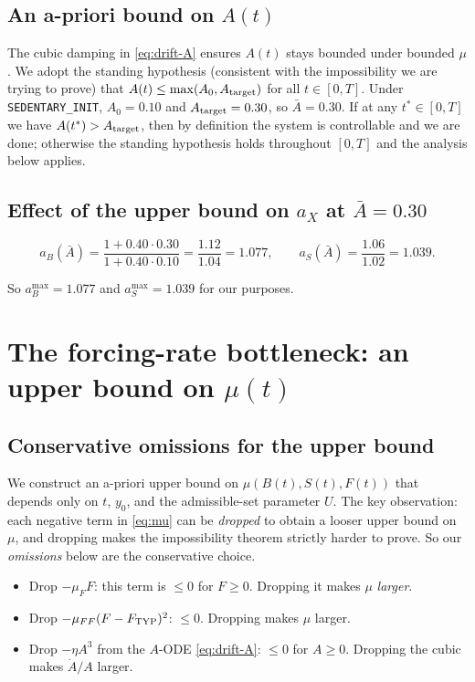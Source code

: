 \documentclass[11pt,a4paper]{article}
\theoremstyle{definition}
\begin{document}
\subsection{An a-priori bound on $A(t)$}

The cubic damping in \eqref{eq:drift-A} ensures $A(t)$ stays bounded under bounded $\mu$. We adopt the standing hypothesis (consistent with the impossibility we are trying to prove) that $A(t) \le \max(A_0, A_{\rm target})$ for all $t \in [0, T]$. Under \texttt{SEDENTARY\_INIT}, $A_0 = 0.10$ and $A_{\rm target} = 0.30$, so $\bar A = 0.30$. If at any $t^* \in [0, T]$ we have $A(t^*) > A_{\rm target}$, then by definition the system is controllable and we are done; otherwise the standing hypothesis holds throughout $[0, T]$ and the analysis below applies.

\subsection{Effect of the upper bound on $a_X$ at $\bar A = 0.30$}

\[
a_B(\bar A) = \frac{1 + 0.40 \cdot 0.30}{1 + 0.40 \cdot 0.10} = \frac{1.12}{1.04} = 1.077,
\qquad
a_S(\bar A) = \frac{1.06}{1.02} = 1.039.
\]

So $a_B^{\max} = 1.077$ and $a_S^{\max} = 1.039$ for our purposes.

\section{The forcing-rate bottleneck: an upper bound on $\mu(t)$} \label{sec:bottleneck}

\subsection{Conservative omissions for the upper bound}

We construct an a-priori upper bound on $\mu(B(t), S(t), F(t))$ that depends only on $t$, $y_0$, and the admissible-set parameter $U$. The key observation: each negative term in \eqref{eq:mu} can be \emph{dropped} to obtain a looser upper bound on $\mu$, and dropping makes the impossibility theorem strictly harder to prove. So our \emph{omissions} below are the conservative choice.

\begin{itemize}
  \item Drop $-\mu_F F$: this term is $\le 0$ for $F \ge 0$. Dropping it makes $\mu$ \emph{larger}.
  \item Drop $-\mu_{FF}(F - F_{\rm TYP})^2$: $\le 0$. Dropping makes $\mu$ larger.
  \item Drop $-\eta A^3$ from the $A$-ODE \eqref{eq:drift-A}: $\le 0$ for $A \ge 0$. Dropping the cubic makes $\dot A / A$ larger.
\end{itemize}
\end{document}
